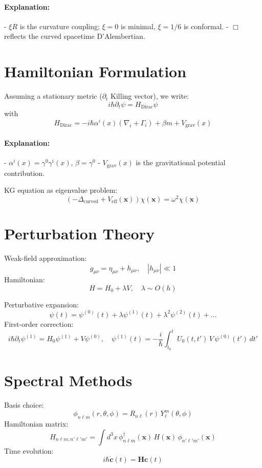 \documentclass[12pt,a4paper]{article}
\begin{document}
\paragraph{Explanation:}  
- \(\xi R\) is the curvature coupling; \(\xi=0\) is minimal, \(\xi=1/6\) is conformal.  
- \(\Box\) reflects the curved spacetime D'Alembertian.

\section{Hamiltonian Formulation}
Assuming a stationary metric (\(\partial_t\) Killing vector), we write:
\[
i\hbar \partial_t\psi = H_{\mathrm{Dirac}}\psi
\]
with
\begin{equation}\label{eq:dirac_ham}
H_{\mathrm{Dirac}} = -i\hbar \alpha^i(x)(\nabla_i+\Gamma_i) + \beta m + V_{\mathrm{grav}}(x)
\end{equation}
\paragraph{Explanation:}  
- \(\alpha^i(x)=\gamma^0\gamma^i(x)\), \(\beta=\gamma^0\)  
- \(V_{\mathrm{grav}}(x)\) is the gravitational potential contribution.  

KG equation as eigenvalue problem:
\[
(-\Delta_{\mathrm{curved}} + V_{\mathrm{eff}}(\mathbf{x}))\chi(\mathbf{x}) = \omega^2 \chi(\mathbf{x})
\]

\section{Perturbation Theory}
Weak-field approximation:
\[
g_{\mu\nu}=\eta_{\mu\nu}+h_{\mu\nu},\quad |h_{\mu\nu}|\ll 1
\]
Hamiltonian:
\[
H=H_0 + \lambda V,\quad \lambda\sim O(h)
\]

Perturbative expansion:
\[
\psi(t)=\psi^{(0)}(t)+\lambda\psi^{(1)}(t)+\lambda^2\psi^{(2)}(t)+\dots
\]
First-order correction:
\[
i\hbar\partial_t\psi^{(1)} = H_0\psi^{(1)} + V\psi^{(0)},\quad
\psi^{(1)}(t) = -\frac{i}{\hbar}\int_{t_0}^t U_0(t,t')\,V\,\psi^{(0)}(t')\,dt'
\]

\section{Spectral Methods}
Basis choice:
\[
\phi_{n\ell m}(r,\theta,\phi)=R_{n\ell}(r)\,Y_\ell^m(\theta,\phi)
\]
Hamiltonian matrix:
\[
H_{n\ell m; n'\ell' m'} = \int d^3x\,\phi_{n\ell m}^\dagger(\mathbf{x})\,H(\mathbf{x})\,\phi_{n'\ell' m'}(\mathbf{x})
\]
Time evolution:
\[
i\hbar \dot{\mathbf{c}}(t) = \mathbf{H}\mathbf{c}(t)
\]
\end{document}
